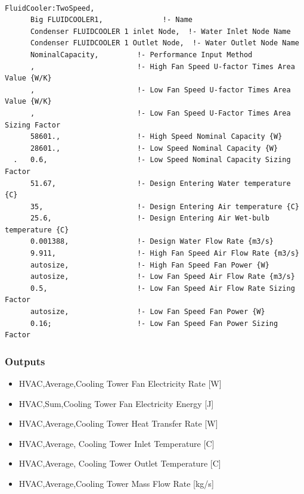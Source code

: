 \begin{lstlisting}

FluidCooler:TwoSpeed,
      Big FLUIDCOOLER1,              !- Name
      Condenser FLUIDCOOLER 1 inlet Node,  !- Water Inlet Node Name
      Condenser FLUIDCOOLER 1 Outlet Node,  !- Water Outlet Node Name
      NominalCapacity,         !- Performance Input Method
      ,                        !- High Fan Speed U-factor Times Area Value {W/K}
      ,                        !- Low Fan Speed U-factor Times Area Value {W/K}
      ,                        !- Low Fan Speed U-Factor Times Area Sizing Factor
      58601.,                  !- High Speed Nominal Capacity {W}
      28601.,                  !- Low Speed Nominal Capacity {W}
  .   0.6,                     !- Low Speed Nominal Capacity Sizing Factor
      51.67,                   !- Design Entering Water temperature {C}
      35,                      !- Design Entering Air temperature {C}
      25.6,                    !- Design Entering Air Wet-bulb temperature {C}
      0.001388,                !- Design Water Flow Rate {m3/s}
      9.911,                   !- High Fan Speed Air Flow Rate {m3/s}
      autosize,                !- High Fan Speed Fan Power {W}
      autosize,                !- Low Fan Speed Air Flow Rate {m3/s}
      0.5,                     !- Low Fan Speed Air Flow Rate Sizing Factor
      autosize,                !- Low Fan Speed Fan Power {W}
      0.16;                    !- Low Fan Speed Fan Power Sizing Factor
\end{lstlisting}

\subsubsection{Outputs}\label{outputs-9-000}

\begin{itemize}
\item
  HVAC,Average,Cooling Tower Fan Electricity Rate {[}W{]}
\item
  HVAC,Sum,Cooling Tower Fan Electricity Energy {[}J{]}
\item
  HVAC,Average,Cooling Tower Heat Transfer Rate {[}W{]}
\item
  HVAC,Average, Cooling Tower Inlet Temperature {[}C{]}
\item
  HVAC,Average, Cooling Tower Outlet Temperature {[}C{]}
\item
  HVAC,Average,Cooling Tower Mass Flow Rate {[}kg/s{]}
\end{itemize}

